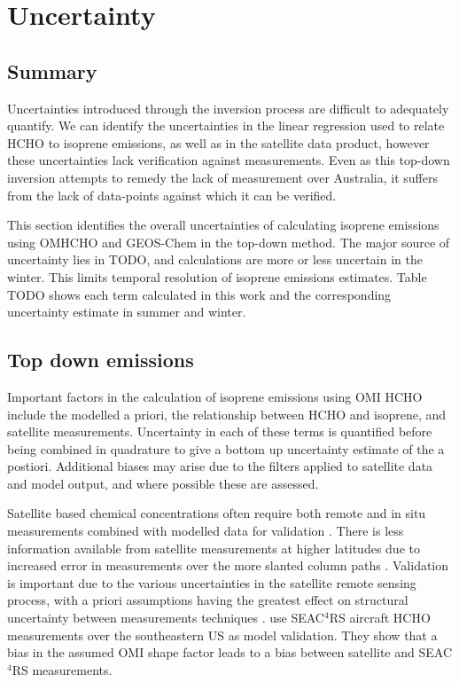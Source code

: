 \section{Uncertainty}
\label{BioIsop:uncertainty}
  
  \subsection{Summary}
    \label{BioIsop:uncertainty:summary}
    Uncertainties introduced through the inversion process are difficult to adequately quantify. 
    We can identify the uncertainties in the linear regression used to relate HCHO to isoprene emissions, as well as in the satellite data product, however these uncertainties lack verification against measurements.
    Even as this top-down inversion attempts to remedy the lack of measurement over Australia, it suffers from the lack of data-points against which it can be verified.
    
    This section identifies the overall uncertainties of calculating isoprene emissions using OMHCHO and GEOS-Chem in the top-down method.
    The major source of uncertainty lies in TODO, and calculations are more or less uncertain in the winter.
    This limits temporal resolution of isoprene emissions estimates.
    Table TODO shows each term calculated in this work and the corresponding uncertainty estimate in summer and winter.
    
    
  
  \subsection{Top down emissions}
    \label{BioIsop:uncertainty:eomi}
    Important factors in the calculation of isoprene emissions using OMI HCHO include the modelled a priori, the relationship between HCHO and isoprene, and satellite measurements.
    Uncertainty in each of these terms is quantified before being combined in quadrature to give a bottom up uncertainty estimate of the a postiori.
    Additional biases may arise due to the filters applied to satellite data and model output, and where possible these are assessed. 
    
    Satellite based chemical concentrations often require both remote and in situ measurements combined with modelled data for validation \parencite{Marais2014}.
    There is less information available from satellite measurements at higher latitudes due to increased error in measurements over the more slanted column paths \parencite{DeSmedt2015}.
    Validation is important due to the various uncertainties in the satellite remote sensing process, with a priori assumptions having the greatest effect on structural uncertainty between measurements techniques \textcite{Lorente2017}.
    \textcite{Zhu2016} use SEAC$^4$RS aircraft HCHO measurements over the southeastern US as model validation. 
    They show that a bias in the assumed OMI shape factor leads to a bias between satellite and SEAC$^4$RS measurements.
    

